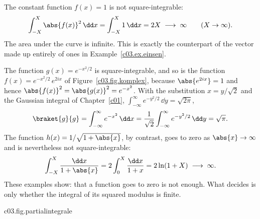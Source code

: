 \begin{vertiefung}
  \begin{example}\label{c03.ex.eins}
    The constant function $f(x) = 1$ is not square-integrable:
    \begin{equation}\label{c03.eq.eins}
      \int_{-X}^{X} \abs{f(x)}^2\, \dd x = \int_{-X}^{X} 1\, \dd x = 2X
      \;\longrightarrow\; \infty
      \qquad (X \to \infty) .
    \end{equation}
    The area under the curve is infinite. This is exactly the counterpart of the vector made
    up entirely of ones in Example~\ref{c03.ex.einsen}.
  \end{example}

  \begin{example}\label{c03.ex.gauss}
    The function $g(x) = e^{-x^2/2}$ is square-integrable, and so is the function
    $f(x) = e^{-x^2/2}\, e^{2ix}$ of Figure~\ref{c03.fig.komplex}, because
    $\abs{e^{2ix}} = 1$ and hence $\abs{f(x)}^2 = \abs{g(x)}^2 = e^{-x^2}$. With the
    substitution $x = y/\sqrt{2}$ and the Gaussian integral of Chapter~\ref{c01},
    $\int_{-\infty}^{\infty} e^{-y^2/2}\, \dd y = \sqrt{2\pi}$,
    \begin{equation}\label{c03.eq.gauss}
      \braket{g}{g} = \int_{-\infty}^{\infty} e^{-x^2}\, \dd x
      = \frac{1}{\sqrt{2}} \int_{-\infty}^{\infty} e^{-y^2/2}\, \dd y
      = \sqrt{\pi} .
    \end{equation}
    The function $h(x) = 1/\sqrt{1 + \abs{x}}$, by contrast, goes to zero as
    $\abs{x} \to \infty$ and is nevertheless not square-integrable:
    \begin{equation}\label{c03.eq.log}
      \int_{-X}^{X} \frac{\dd x}{1 + \abs{x}} = 2 \int_{0}^{X} \frac{\dd x}{1 + x}
      = 2 \ln(1 + X) \;\longrightarrow\; \infty .
    \end{equation}
    These examples show: that a function goes to zero is not enough. What decides is only
    whether the integral of its squared modulus is finite.
  \end{example}

  \begin{tpcfigure}{c03.fig.partialintegrale}
    \caption{The same test for functions: the integral $\int_{-X}^{X} \abs{f(x)}^2\, \dd x$
      as a function of $X$. For $f(x) = e^{-x^2/2}$ (solid) it approaches $\sqrt{\pi}$ (thin
      line, Equation~\eqref{c03.eq.gauss}); for $f(x) = 1/\sqrt{1 + \abs{x}}$ (dashed) it
      grows like $2\ln(1 + X)$, for $f = 1$ (dash-dotted) like $2X$
      (Equations~\eqref{c03.eq.log} and~\eqref{c03.eq.eins}). The lines show continuously
      what Figure~\ref{c03.fig.partialsummen} shows for the discrete index $j$.}
  \end{tpcfigure}
\end{vertiefung}

